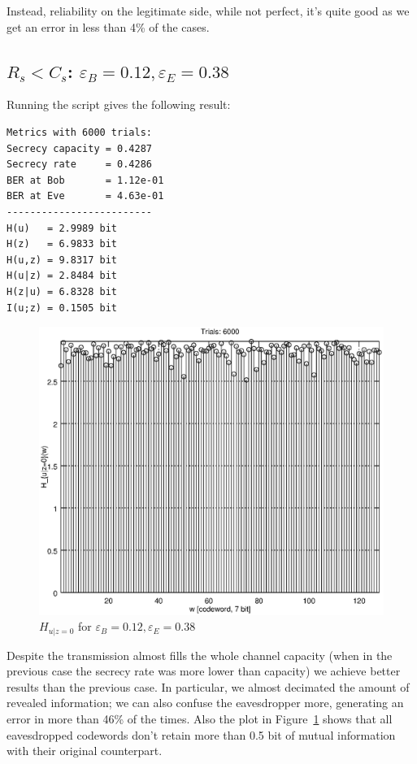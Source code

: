 \documentclass[a4paper,12pt,titlepage]{article}
\begin{document}
Instead, reliability on the legitimate side, while not perfect, it's quite good
as we get an error in less than 4\% of the cases.

\subsection*{$R_s < C_s$: $\varepsilon_B = 0.12, \varepsilon_E = 0.38$}
Running the script gives the following result:
\begin{verbatim}
Metrics with 6000 trials:
Secrecy capacity = 0.4287
Secrecy rate     = 0.4286
BER at Bob       = 1.12e-01
BER at Eve       = 4.63e-01
-------------------------
H(u)   = 2.9989 bit
H(z)   = 6.9833 bit
H(u,z) = 9.8317 bit
H(u|z) = 2.8484 bit
H(z|u) = 6.8328 bit
I(u;z) = 0.1505 bit
\end{verbatim}

\begin{figure}[h]
  \centering
  \includegraphics[scale=0.8]{bsc__0_120_0_380__6000.eps}
  \caption{$H_{u|z=0}$ for $\varepsilon_B = 0.12, \varepsilon_E = 0.38$}
  \label{fig:bsc_0.12_0.38}
\end{figure}

Despite the transmission almost fills the whole channel capacity (when in the
previous case the secrecy rate was more lower than capacity) we achieve
better results than the previous case. In particular, we almost decimated the
amount of revealed information; we can also confuse the eavesdropper more,
generating an error in more than 46\% of the times. Also the plot in
Figure~\ref{fig:bsc_0.12_0.38} shows that all eavesdropped codewords don't
retain more than 0.5 bit of mutual information with their original counterpart.
\end{document}
